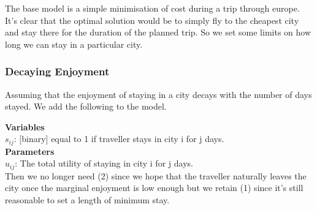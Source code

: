 \documentclass[12pt]{article}
\begin{document}
The base model is a simple minimisation of cost during a trip through europe. It's clear that the optimal solution would be to simply fly to the cheapest city and stay there for the duration of the planned trip. So we set some limits on how long we can stay in a particular city.

\newpage
\subsubsection{Decaying Enjoyment}
Assuming that the enjoyment of staying in a city decays with the number of days stayed. We add the following to the model.

\textbf{Variables}\\
$s_{ij}$: [binary] equal to 1 if traveller stays in city i for j days.\\

\textbf{Parameters} \\
$u_{ij}$: The total utility of staying in city i for j days.\\

Then we no longer need (2) since we hope that the traveller naturally leaves the city once the marginal enjoyment is low enough but we retain (1) since it's still reasonable to set a length of minimum stay.
\end{document}

